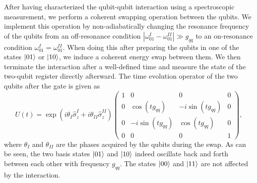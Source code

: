 After having characterized the qubit-qubit interaction using a spectroscopic measurement, we perform a coherent swapping operation between the qubits. We implement this operation by non-adiabatically changing the resonance frequency of the qubits from an off-resonance condition $|\omega_{01}^I-\omega_{01}^{II}|\gg g_{qq}$ to an on-resonance condition $\omega_{01}^I=\omega_{01}^{II}$. When doing this after preparing the qubits in one of the states $\left| 01 \right>$ or $\left| 10 \right>$, we induce a coherent energy swap between them. We then terminate the interaction after a well-defined time and measure the state of the two-qubit register directly afterward. The time evolution operator of the two qubits after the gate is given as
%
\begin{equation}
U(t)=\exp{\left(i\theta_I\hat{\sigma}_z^I+i\theta_{II}\hat{\sigma}_z^{II}\right)}\left(\begin{array}{cccc}
1 & 0 & 0 & 0\\
0 & \cos{(tg_{qq})} & -i\sin{(tg_{qq})} & 0\\
0 & -i\sin{(tg_{qq})} & \cos{(tg_{qq})} & 0\\
0 & 0 & 0 & 1\end{array}\right), \label{eq:swap_evolution_operator_main}
\end{equation}
%
where $\theta_I$ and $\theta_{II}$ are the phases acquired by the qubits during the swap. As can be seen, the two basis states $\left| 01 \right>$ and $\left| 10 \right>$ indeed oscillate back and forth between each other with frequency $g_{qq}$. The states $\left| 00 \right>$ and $\left| 11 \right>$ are not affected by the interaction.

\smallskip

